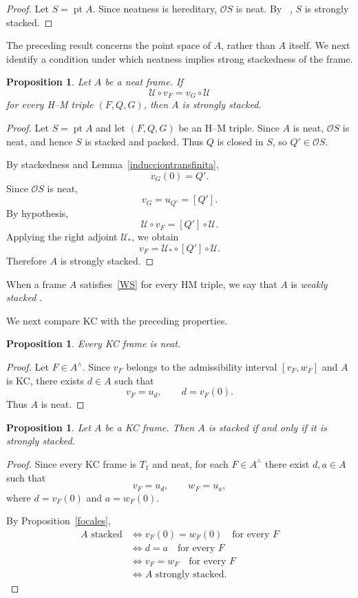 \documentclass[11pt]{amsart}
\DeclareMathOperator{\pt}{pt}
\theoremstyle{plain}
\newtheorem{prop}[thm]{Proposition}
\theoremstyle{definition}
\begin{document}
\begin{proof}
Let $S=\pt A$. Since neatness is hereditary,
$\mathcal OS$ is neat. By
~\cite[Theorem 6.2(a)]{sexton2006ordinal},
$S$ is strongly stacked.
\end{proof}


The preceding result concerns the point
space of $A$, rather than $A$ itself.
We next identify a condition under which
neatness implies strong stackedness of
the frame.

\begin{prop}\label{EficienteFapilado}
Let $A$ be a neat frame. If
\begin{equation}\label{WS}
\mathcal U\circ v_F=v_G\circ\mathcal U
\end{equation}
for every H--M triple $(F,Q,G)$, then
$A$ is strongly stacked.
\end{prop}

\begin{proof}
Let $S=\pt A$ and let $(F,Q,G)$ be an
H--M triple. Since $A$ is neat,
$\mathcal OS$ is neat, and hence $S$
is stacked and packed. Thus $Q$ is
closed in $S$, so $Q'\in\mathcal OS$.

By stackedness and Lemma~\ref{inducciontransfinita},
\[
v_G(0)=Q'.
\]
Since $\mathcal OS$ is neat,
\[
v_G=u_{Q'}=[Q'].
\]
By hypothesis,
\[
\mathcal U\circ v_F=[Q']\circ\mathcal U.
\]
Applying the right adjoint $\mathcal U_*$,
we obtain
\[
v_F=\mathcal U_*\circ[Q']\circ\mathcal U.
\]
Therefore $A$ is strongly stacked.
\end{proof}

When a frame $A$ satisfies~\eqref{WS} for every HM triple, 
we say that $A$ is \emph{weakly stacked}
.

We next compare KC with the preceding
properties.

\begin{prop}\label{KCneat}
Every KC frame is neat.
\end{prop}

\begin{proof}
Let $F\in A^\wedge$. Since $v_F$ belongs
to the admissibility interval $[v_F,w_F]$
and $A$ is KC, there exists $d\in A$
such that
\[
v_F=u_d,\qquad d=v_F(0).
\]
Thus $A$ is neat.
\end{proof}

\begin{prop}\label{SSiffS}
Let $A$ be a KC frame. Then $A$ is
stacked if and only if it is strongly
stacked.
\end{prop}

\begin{proof}
Since every KC frame is $T_1$ and neat,
for each $F\in A^\wedge$ there exist
$d,a\in A$ such that
\[
v_F=u_d,\qquad w_F=u_a,
\]
where $d=v_F(0)$ and $a=w_F(0)$.

By Proposition~\ref{focales},
\[
\begin{aligned}
A\text{ stacked}
&\iff v_F(0)=w_F(0)
       \quad\text{for every }F\\
&\iff d=a
       \quad\text{for every }F\\
&\iff v_F=w_F
       \quad\text{for every }F\\
&\iff A\text{ strongly stacked}.
\end{aligned}
\]
\end{proof}
\end{document}
